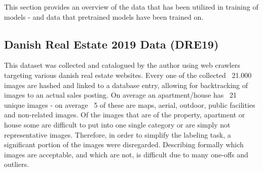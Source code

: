 This section provides an overview of the data that has been utilized in training of models - and data that pretrained models have been trained on.

\subsection{Danish Real Estate 2019 Data (DRE19)}\label{sec:DRE19}
This dataset was collected and catalogued by the author using web crawlers targeting various danish real estate websites. 
Every one of the collected ~21.000 images are hashed and linked to a database entry, allowing for backtracking of images to an actual sales posting.
\newline
On average an apartment/house has ~21 unique images - on average ~5 of these are maps, aerial, outdoor, public facilities and non-related images.
Of the images that are of the property, apartment or house some are difficult to put into one single category or are simply not representative images.
Therefore, in order to simplify the labeling task, a significant portion of the images were disregarded.
\newline
Describing formally which images are acceptable, and which are not, is difficult due to many one-offs and outliers.
